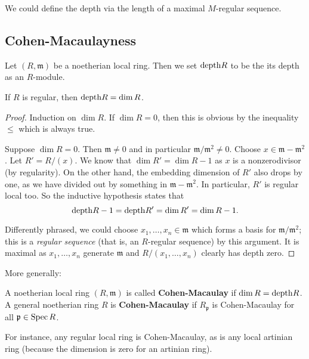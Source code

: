 \begin{remark}
We could define the depth via the length of a maximal
$M$-regular sequence.
\end{remark}


\subsection{Cohen-Macaulayness}

\begin{definition}
Let $(R, \mathfrak{m})$ be a noetherian local ring. Then
we set $\mathrm{depth} R$ to be the its depth as an $R$-module.
\end{definition}




\begin{example}
If $R$ is regular, then $\mathrm{depth} R = \dim R$.
\end{example}
\begin{proof}
Induction on $\dim R$. If $\dim R=0$, then this is obvious by
the inequality
$\leq $ which is always true.

Suppose $\dim R = 0$. Then $\mathfrak{m} \neq 0$ and in
particular
$\mathfrak{m}/\mathfrak{m}^2 \neq 0$. Choose $x \in
\mathfrak{m}-
\mathfrak{m}^2$. Let $R'=R/(x)$. We know that $\dim R' = \dim
R-1$ as $x$ is a
nonzerodivisor (by regularity). On the other hand, the embedding
dimension of $R'$ also drops
by one, as we have divided out by something in $\mathfrak{m} -
\mathfrak{m}^2$.
In particular, $R'$ is regular local too. So the inductive
hypothesis states
that
\[\mathrm{depth} R-1 =  \mathrm{depth} R' = \dim R' = \dim R -1.   \]

Differently phrased, we could choose $x_1, \dots, x_n \in
\mathfrak{m}$ which forms a basis for
$\mathfrak{m}/\mathfrak{m}^2$; this is a
\emph{regular sequence} (that is, an $R$-regular sequence) by
this argument. It
is maximal as $x_1, \dots, x_n$ generate $\mathfrak{m}$ and
$R/(x_1, \dots,
x_n)$ clearly has depth zero.
\end{proof}

More generally:
\begin{definition}
A noetherian local ring $(R, \mathfrak{m})$ is called
\textbf{Cohen-Macaulay}
if $\dim R = \mathrm{depth} R$. A general noetherian ring $R$ is
\textbf{Cohen-Macaulay} if
$R_{\mathfrak{p}}$ is Cohen-Macaulay for all $\mathfrak{p} \in
\operatorname{Spec} R$.
\end{definition}
For instance, any regular local ring is Cohen-Macaulay, as is
any local
artinian ring (because the dimension is zero for an artinian
ring).


